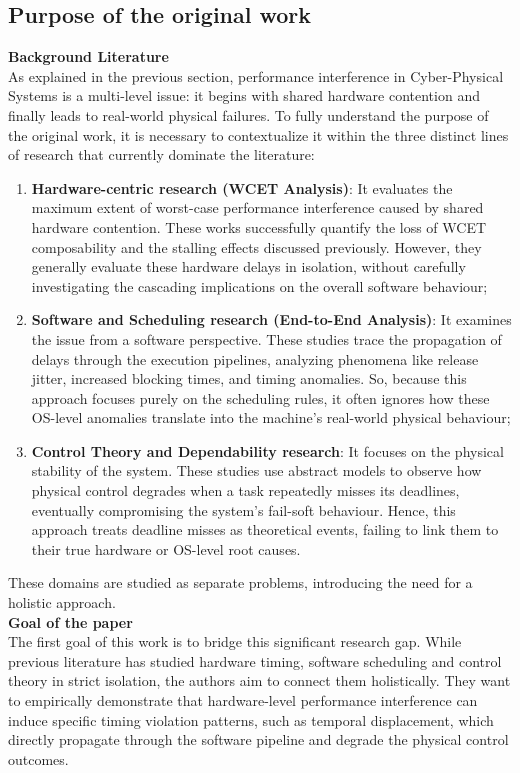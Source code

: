 \subsection{Purpose of the original work} \label{sec:1.2}
\textbf{Background Literature} \\
As explained in the previous section, performance interference in Cyber-Physical Systems is a multi-level issue: it begins with shared hardware contention and finally leads to real-world physical failures.
To fully understand the purpose of the original work, it is necessary to contextualize it within the three distinct lines of research that currently dominate the literature:
\begin{enumerate}[nosep]
    \item \textbf{Hardware-centric research (WCET Analysis)}: It evaluates the maximum extent of worst-case performance interference caused by shared hardware contention. These works successfully quantify the loss of WCET composability and the stalling effects discussed previously. However, they generally evaluate these hardware delays in isolation, without carefully investigating the cascading implications on the overall software behaviour;
    \item \textbf{Software and Scheduling research (End-to-End Analysis)}: It examines the issue from a software perspective. These studies trace the propagation of delays through the execution pipelines, analyzing phenomena like release jitter, increased blocking times, and timing anomalies. So, because this approach focuses purely on the scheduling rules, it often ignores how these OS-level anomalies translate into the machine's real-world physical behaviour;
    \item \textbf{Control Theory and Dependability research}: It focuses on the physical stability of the system. These studies use abstract models to observe how physical control degrades when a task repeatedly misses its deadlines, eventually compromising the system's fail-soft behaviour. Hence, this approach treats deadline misses as theoretical events, failing to link them to their true hardware or OS-level root causes.
\end{enumerate}
These domains are studied as separate problems, introducing the need for a holistic approach.
\\
\textbf{Goal of the paper} \\
The first goal of this work is to bridge this significant research gap. While previous literature has studied hardware timing, software scheduling and control theory in strict isolation, the authors aim to connect them holistically. They want to empirically demonstrate that hardware-level performance interference can induce specific timing violation patterns, such as temporal displacement, which directly propagate through the software pipeline and degrade the physical control outcomes.

